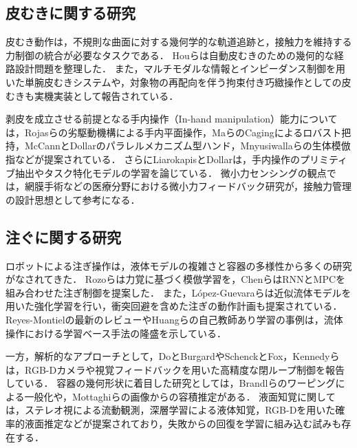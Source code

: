 \subsection{皮むきに関する研究}
皮むき動作は，不規則な曲面に対する幾何学的な軌道追跡と，接触力を維持する力制御の統合が必要なタスクである．
Houら\cite{Hou2022PeelingPlanning}は自動皮むきのための幾何的な経路設計問題を整理した．
また，マルチモダルな情報とインピーダンス制御を用いた単腕皮むきシステム\cite{Arxiv2024MultimodalPeeling}や，対象物の再配向を伴う拘束付き巧緻操作としての皮むき\cite{Arxiv2024ConstrainedDexterousPeeling}も実機実装として報告されている．

剥皮を成立させる前提となる手内操作（In-hand manipulation）能力については，Rojasら\cite{Rojas2016GR2}の劣駆動機構による手内平面操作，Maら\cite{Ma2017WholeHandCaging}のCagingによるロバスト把持，McCannとDollar\cite{McCann2017StewartHand}のパラレルメカニズム型ハンド，Mnyusiwallaら\cite{Mnyusiwalla2016BioInspiredInsideHand}の生体模倣指などが提案されている．
さらにLiarokapisとDollarは，手内操作のプリミティブ抽出\cite{Liarokapis2017Primitives}やタスク特化モデルの学習\cite{Liarokapis2016TaskSpecificModels}を論じている．
微小力センシングの観点では，網膜手術などの医療分野における微小力フィードバック研究\cite{Balicki2010MicroForcePeeling}が，接触力管理の設計思想として参考になる．

\subsection{注ぐに関する研究}
ロボットによる注ぎ操作は，液体モデルの複雑さと容器の多様性から多くの研究がなされてきた．
Rozoら\cite{Rozo2013PouringForceBased}は力覚に基づく模倣学習を，Chenら\cite{Chen2019RNNMPCPouring}はRNNとMPCを組み合わせた注ぎ制御を提案した．
また，López-Guevaraら\cite{LopezGuevara2017NotToSpill}は近似流体モデルを用いた強化学習を行い，衝突回避を含めた注ぎの動作計画\cite{AAAI2023PouringPlanning}も提案されている．
Reyes-Montiel\cite{ReyesMontiel2026PouringReview}の最新のレビューやHuangら\cite{Huang2021SelfSupervisedPouring}の自己教師あり学習の事例は，流体操作における学習ベース手法の隆盛を示している．

一方，解析的なアプローチとして，DoとBurgard\cite{DoBurgard2018AccuratePouring}やSchenckとFox\cite{SchenckFox2017ClosedLoopPouring}，Kennedyら\cite{Kennedy2017Dispensing}は，RGB-Dカメラや視覚フィードバックを用いた高精度な閉ループ制御を報告している．
容器の幾何形状に着目した研究としては，Brandlら\cite{Brandl2014WarpedPouring}のワーピングによる一般化や，Mottaghiら\cite{Mottaghi2017GlassHalfFull}の画像からの容積推定がある．
液面知覚に関しては，ステレオ視による流動観測\cite{YamaguchiAtkeson2016StereoFlow}，深層学習による液体知覚\cite{SchenckFox2016LiquidsISER}，RGB-Dを用いた確率的液面推定\cite{Do2016ProbLiquidLevel}などが提案されており，失敗からの回復を学習に組み込む試み\cite{Langsfeld2014FailureToSuccessPouring}も存在する．


